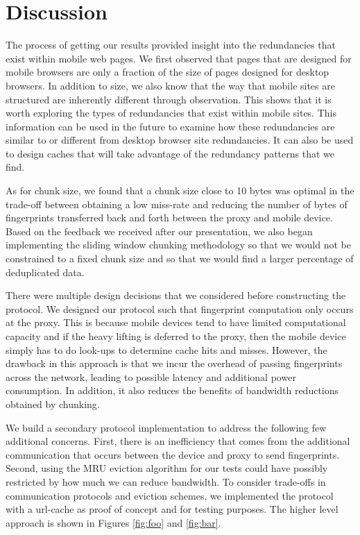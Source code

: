 \section{Discussion}
\label{sec:discussion}
The process of getting our results provided insight into the redundancies that exist within mobile web pages. We first observed that pages that are designed for mobile browsers are only a fraction of the size of pages designed for desktop browsers. In addition to size, we also know that the way that mobile sites are structured are inherently different through observation. This shows that it is worth exploring the types of redundancies that exist within mobile sites. This information can be used in the future to examine how these redundancies are similar to or different from desktop browser site redundancies. It can also be used to design caches that will take advantage of the redundancy patterns that we find. 

As for chunk size, we found that a chunk size close to 10 bytes was optimal in the trade-off between obtaining a low miss-rate and reducing the number of bytes of fingerprints transferred back and forth between the proxy and mobile device. Based on the feedback we received after our presentation, we also began implementing the sliding window chunking methodology so that we would not be constrained to a fixed chunk size and so that we would find a larger percentage of deduplicated data. 

There were multiple design decisions that we considered before constructing the protocol. We designed our protocol such that fingerprint computation only occurs at the proxy. This is because mobile devices tend to have limited computational capacity and if the heavy lifting is deferred to the proxy, then the mobile device simply has to do look-ups to determine cache hits and misses. However, the drawback in this approach is that we incur the overhead of passing fingerprints across the network, leading to possible latency and additional power consumption. In addition, it also reduces the benefits of bandwidth reductions obtained by chunking.

We build a secondary protocol implementation to address the following few additional concerns. First, there is an inefficiency that comes from the additional communication that occurs between the device and proxy to send fingerprints. Second, using the MRU eviction algorithm for our tests could have possibly restricted by how much we can reduce bandwidth. To consider trade-offs in communication protocols and eviction schemes, we implemented the protocol with a url-cache as proof of concept and for testing purposes. The higher level approach is shown in Figures \ref{fig:foo} and \ref{fig:bar}. 

